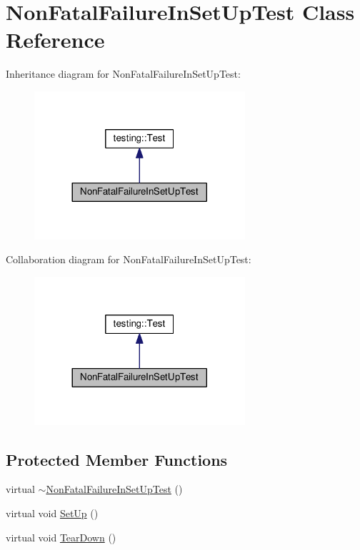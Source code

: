 \hypertarget{classNonFatalFailureInSetUpTest}{}\section{Non\+Fatal\+Failure\+In\+Set\+Up\+Test Class Reference}
\label{classNonFatalFailureInSetUpTest}


Inheritance diagram for Non\+Fatal\+Failure\+In\+Set\+Up\+Test\+:
\nopagebreak
\begin{figure}[H]
\begin{center}
\leavevmode
\includegraphics[width=221pt]{classNonFatalFailureInSetUpTest__inherit__graph}
\end{center}
\end{figure}


Collaboration diagram for Non\+Fatal\+Failure\+In\+Set\+Up\+Test\+:
\nopagebreak
\begin{figure}[H]
\begin{center}
\leavevmode
\includegraphics[width=221pt]{classNonFatalFailureInSetUpTest__coll__graph}
\end{center}
\end{figure}
\subsection*{Protected Member Functions}
\begin{DoxyCompactItemize}
\item 
virtual \hyperlink{classNonFatalFailureInSetUpTest_ae4b4ee1812e3427cf82b155256547442}{$\sim$\+Non\+Fatal\+Failure\+In\+Set\+Up\+Test} ()
\item 
virtual void \hyperlink{classNonFatalFailureInSetUpTest_ae24c724bae1fcd2601f58fa9c26adca3}{Set\+Up} ()
\item 
virtual void \hyperlink{classNonFatalFailureInSetUpTest_a36abc808b11afc6a9bfa20dac5c28c30}{Tear\+Down} ()
\end{DoxyCompactItemize}
